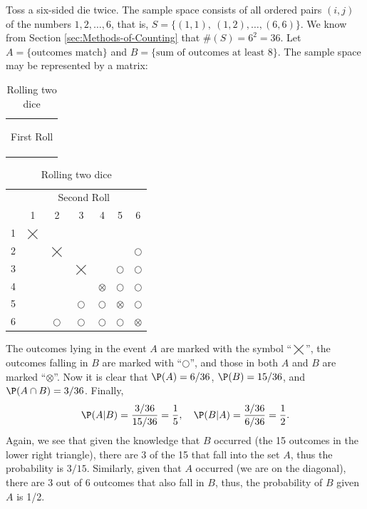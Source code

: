 \documentclass[captions=tableheading]{scrbook}
\begin{document}
\begin{example}
\label{exa:Toss-a-six-sided-die-twice}
Toss a six-sided die twice. The sample space consists of all ordered pairs \((i,j)\) of the numbers \(1,2,\ldots,6\), that is, \( S = \{ (1,1),\ (1,2),\ldots,(6,6) \} \). We know from Section \ref{sec:Methods-of-Counting} that \( \# (S) = 6^{2} = 36 \). Let \( A = \{ \mbox{outcomes match} \} \) and \( B = \{ \mbox{sum of outcomes at least 8} \} \). The sample space may be represented by a matrix:

\begin{table}
\begin{center}
\begin{tabular}{c}
\begin{sideways}
First Roll
\end{sideways}\tabularnewline
\end{tabular}\begin{tabular}{c|cccccc|}
\multicolumn{1}{c}{} & \multicolumn{6}{c}{Second Roll}\tabularnewline
\multicolumn{1}{c}{} & 1 & 2 & 3 & 4 & 5 & \multicolumn{1}{c}{6}\tabularnewline
\cline{2-7} 
1 & \(\varprod\) &  &  &  &  & \tabularnewline
2 &  & \(\varprod\) &  &  &  & {\Large \(\bigcirc\)}\tabularnewline
3 &  &  & \(\varprod\) &  & {\Large \(\bigcirc\)} & {\Large \(\bigcirc\)}\tabularnewline
4 &  &  &  & {\huge \(\otimes\)} & {\Large \(\bigcirc\)} & {\Large \(\bigcirc\)}\tabularnewline
5 &  &  & {\Large \(\bigcirc\)} & {\Large \(\bigcirc\)} & {\huge \(\otimes\)} & {\Large \(\bigcirc\)}\tabularnewline
6 &  & {\Large \(\bigcirc\)} & {\Large \(\bigcirc\)} & {\Large \(\bigcirc\)} & {\Large \(\bigcirc\)} & {\huge \(\otimes\)}\tabularnewline
\cline{2-7} 
\end{tabular}
\caption{Rolling two dice\label{tab:Rolling-two-dice}}
\end{center}
\end{table}

The outcomes lying in the event \(A\) are marked with the symbol ``\(\varprod\)'', the outcomes falling in \(B\) are marked with ``\(\bigcirc\)'', and those in both \(A\) and \(B\) are marked ``\(\otimes\)''. Now it is clear that \(\P(A)=6/36\), \(\P(B)=15/36\), and \(\P(A\cap B)=3/36\).  Finally, 
\[
\P(A|B)=\frac{3/36}{15/36}=\frac{1}{5},\quad\P(B|A)=\frac{3/36}{6/36}=\frac{1}{2}.
\]
Again, we see that given the knowledge that \(B\) occurred (the 15 outcomes in the lower right triangle), there are 3 of the 15 that fall into the set \(A\), thus the probability is \(3/15\). Similarly, given that \(A\) occurred (we are on the diagonal), there are 3 out of 6 outcomes that also fall in \(B\), thus, the probability of \(B\) given \(A\) is 1/2. 
\end{example}
\end{document}
